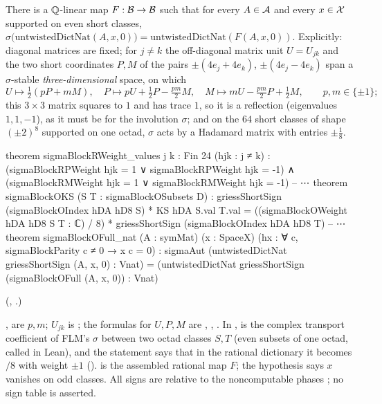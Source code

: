 \begin{theorem}\label{ch22:thm:sigmaeven}
There is a ${\mathbb{Q}}$-linear map $F:\mathcal{B}\to\mathcal{B}$ such that for every $A\in\mathcal{A}$ and every $x\in\mathcal{X}$
supported on even short classes,
$\sigma\bigl(\mathrm{untwistedDictNat}(A,x,0)\bigr)=\mathrm{untwistedDictNat}(F(A,x,0))$.  Explicitly: diagonal matrices are
fixed; for $j\ne k$ the off-diagonal matrix unit $U=U_{jk}$ and the two short coordinates $P,M$ of the pairs
$\pm(4e_j+4e_k)$, $\pm(4e_j-4e_k)$ span a $\sigma$-stable \emph{three-dimensional} space, on which
\begin{equation*}
  U\mapsto\tfrac12(pP+mM),\quad P\mapsto pU+\tfrac12P-\tfrac{pm}2M,\quad M\mapsto mU-\tfrac{pm}2P+\tfrac12M,\qquad
  p,m\in\{\pm1\};
\end{equation*}
this $3\times3$ matrix squares to $1$ and has trace $1$, so it is a reflection (eigenvalues $1,1,-1$), as it must be for the
involution $\sigma$;
and on the $64$ short classes of shape $(\pm2)^8$ supported on one octad, $\sigma$ acts by a Hadamard matrix with entries
$\pm\tfrac18$.
\end{theorem}
\begin{leancode}
theorem sigmaBlockRWeight_values {j k : Fin 24} (hjk : j ≠ k) :
    (sigmaBlockRPWeight hjk = 1 ∨ sigmaBlockRPWeight hjk = -1) ∧
      (sigmaBlockRMWeight hjk = 1 ∨ sigmaBlockRMWeight hjk = -1)
-- ⋯
theorem sigmaBlockOKS (S T : sigmaBlockOSubsets D) :
    griessShortSign (sigmaBlockOIndex hDA hD8 S) * KS hDA S.val T.val =
      ((sigmaBlockOWeight hDA hD8 S T : ℂ) / 8) *
        griessShortSign (sigmaBlockOIndex hDA hD8 T)
-- ⋯
theorem sigmaBlockOFull_nat (A : symMat) (x : SpaceX)
    (hx : ∀ c, sigmaBlockParity c ≠ 0 → x c = 0) :
    sigmaAut (untwistedDictNat griessShortSign (A, x, 0) : Vnat) =
      (untwistedDictNat griessShortSign (sigmaBlockOFull (A, x, 0)) : Vnat)
\end{leancode}
(, .)
\begin{dictionary}
,  are $p,m$; $U_{jk}$ is ; the formulas for $U,P,M$ are
, , .  In ,  is the
complex transport coefficient of FLM's $\sigma$ between two octad classes $S,T$ (even subsets of one octad, called  in Lean), and the
statement says that in the rational dictionary it becomes $/8$ with weight $\pm1$
().   is the assembled rational map $F$; the hypothesis 
says $x$ vanishes on odd classes.  All signs are relative to the noncomputable phases ; no sign
table is asserted.
\end{dictionary}

